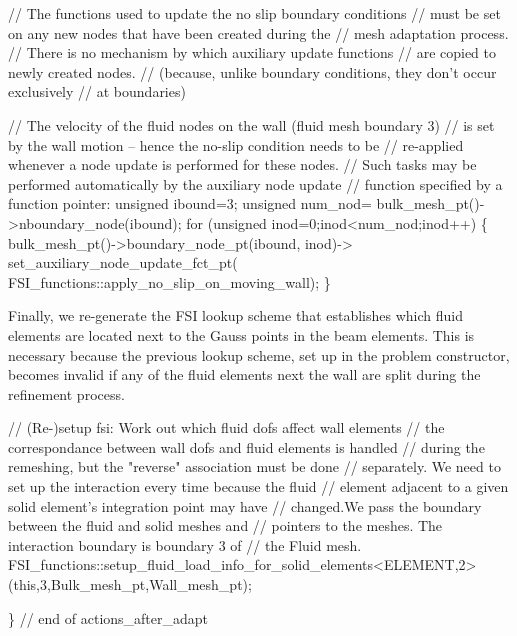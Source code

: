 \begin{DoxyCodeInclude}

 \textcolor{comment}{// The functions used to update the no slip boundary conditions }
 \textcolor{comment}{// must be set on any new nodes that have been created during the }
 \textcolor{comment}{// mesh adaptation process. }
 \textcolor{comment}{// There is no mechanism by which auxiliary update functions }
 \textcolor{comment}{// are copied to newly created nodes.}
 \textcolor{comment}{// (because, unlike boundary conditions, they don't occur exclusively }
 \textcolor{comment}{// at boundaries)}
 
 \textcolor{comment}{// The velocity of the fluid nodes on the wall (fluid mesh boundary 3)}
 \textcolor{comment}{// is set by the wall motion -- hence the no-slip condition needs to be}
 \textcolor{comment}{// re-applied whenever a node update is performed for these nodes. }
 \textcolor{comment}{// Such tasks may be performed automatically by the auxiliary node update }
 \textcolor{comment}{// function specified by a function pointer:}
 \textcolor{keywordtype}{unsigned} ibound=3; 
 \textcolor{keywordtype}{unsigned} num\_nod= bulk\_mesh\_pt()->nboundary\_node(ibound);
 \textcolor{keywordflow}{for} (\textcolor{keywordtype}{unsigned} inod=0;inod<num\_nod;inod++)
  \{
   bulk\_mesh\_pt()->boundary\_node\_pt(ibound, inod)->
    set\_auxiliary\_node\_update\_fct\_pt(
     FSI\_functions::apply\_no\_slip\_on\_moving\_wall);
  \}

\end{DoxyCodeInclude}


Finally, we re-\/generate the F\+SI lookup scheme that establishes which fluid elements are located next to the Gauss points in the beam elements. This is necessary because the previous lookup scheme, set up in the problem constructor, becomes invalid if any of the fluid elements next the wall are split during the refinement process.


\begin{DoxyCodeInclude}

 \textcolor{comment}{// (Re-)setup fsi: Work out which fluid dofs affect wall elements}
 \textcolor{comment}{// the correspondance between wall dofs and fluid elements is handled}
 \textcolor{comment}{// during the remeshing, but the "reverse" association must be done}
 \textcolor{comment}{// separately. We need to set up the interaction every time because the fluid}
 \textcolor{comment}{// element adjacent to a given solid element's integration point may have }
 \textcolor{comment}{// changed.We pass the boundary between the fluid and solid meshes and }
 \textcolor{comment}{// pointers to the meshes. The interaction boundary is boundary 3 of }
 \textcolor{comment}{// the Fluid mesh.}
 FSI\_functions::setup\_fluid\_load\_info\_for\_solid\_elements<ELEMENT,2>
  (\textcolor{keyword}{this},3,Bulk\_mesh\_pt,Wall\_mesh\_pt);


\} \textcolor{comment}{// end of actions\_after\_adapt}

\end{DoxyCodeInclude}




